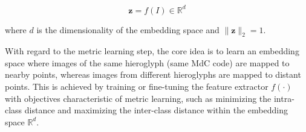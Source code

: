 \documentclass[10pt,onecolumn,letterpaper]{article}
\begin{document}
\begin{equation}
	\mathbf{z} = f(I) \in \mathbb{R}^d
	\label{eq:features}
\end{equation}

where $d$ is the dimensionality of the embedding space and $\|\mathbf{z}\|_2 = 1$. %

With regard to the metric learning step, the core idea is to learn an embedding space where images of the same hieroglyph (same MdC code) are mapped to nearby points, whereas images from different hieroglyphs are mapped to distant points. This is achieved by training or fine-tuning the feature extractor $f(\cdot)$ with objectives characteristic of metric learning, such as minimizing the intra-class distance and maximizing the inter-class distance within the embedding space $\mathbb{R}^d$.
\end{document}
